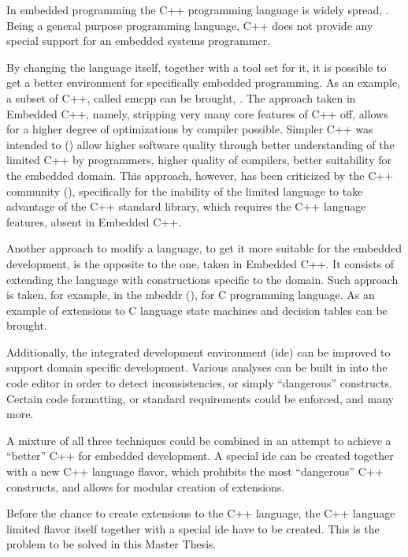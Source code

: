 

In embedded programming the C++ programming language is widely spread, \cite{embedlangs}. Being a general purpose 
programming language, C++ does not provide any special support for an embedded systems programmer. 

By changing  the language itself, together with a tool set for it, it is possible to get a better environment 
for specifically embedded programming. As an example, a subset of C++, called \Gls{emcpp} can be brought, \cite{emcpp}.
The approach taken in Embedded C++, namely, stripping very many core features of C++ off, allows for a higher degree of
optimizations by compiler possible. Simpler C++ was intended to (\cite{stripepp}) allow higher software quality through
better understanding of the limited C++ by programmers, higher quality of compilers, better suitability for the embedded
domain. This approach, however, has been criticized by the C++ community (\cite{stremcpp}), specifically for the inability 
of the limited language to take advantage of the C++ standard library, which requires the C++ language features, absent in 
Embedded C++.

Another approach to modify a language, to get it more suitable for the embedded development, is the opposite to the one,
taken in Embedded C++. It consists of extending the language with constructions specific to the domain. Such approach is
taken, for example, in the \gls{mbeddr} (\cite{2012_voelter_mbeddr_extensible_c_based_language_and_ide_for_embedded}),
for C programming language. As an example of extensions to C language state machines and decision tables can be brought.

Additionally, the integrated development environment (\gls{ide}) can be improved to support domain specific development. 
Various analyses can be built in into the code editor in order to detect inconsistencies, or simply ``dangerous'' constructs.
Certain code formatting, or standard requirements could be enforced, and many more.

A mixture of all three techniques could be combined in an attempt to achieve a ``better'' C++ for embedded development.
A special \gls{ide} can be created together with a new C++ language flavor, which prohibits the most ``dangerous'' C++
constructs, and allows for modular creation of extensions.

Before the chance to create extensions to the C++ language, the C++ language limited flavor itself together with a special \gls{ide}
have to be created. This is the problem to be solved in this Master Thesis.

